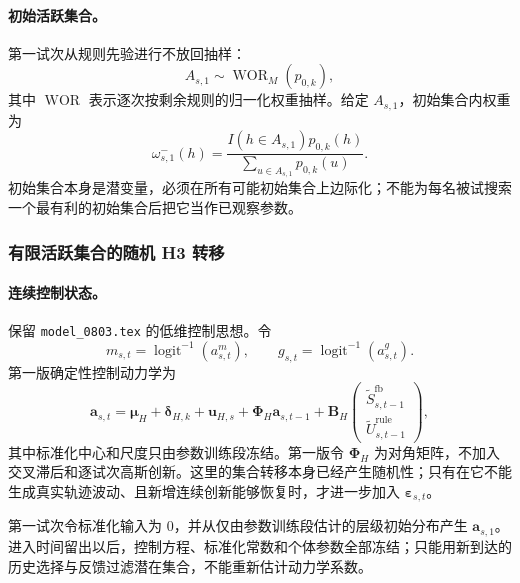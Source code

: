 \paragraph{初始活跃集合。}
第一试次从规则先验进行不放回抽样：
\begin{equation}
    A_{s,1}\sim
    \operatorname{WOR}_M(p_{0,k}),
    \label{eq:model0804-initial-set}
\end{equation}
其中 $\operatorname{WOR}$ 表示逐次按剩余规则的归一化权重抽样。给定 $A_{s,1}$，初始集合内权重为
\begin{equation}
    \omega^-_{s,1}(h)
    =\frac{I(h\in A_{s,1})p_{0,k}(h)}
    {\sum_{u\in A_{s,1}}p_{0,k}(u)}.
    \label{eq:model0804-initial-weight}
\end{equation}
初始集合本身是潜变量，必须在所有可能初始集合上边际化；不能为每名被试搜索一个最有利的初始集合后把它当作已观察参数。


\subsubsection{有限活跃集合的随机 H3 转移}

\paragraph{连续控制状态。}
保留 \texttt{model\_0803.tex} 的低维控制思想。令
\begin{equation}
    m_{s,t}=\operatorname{logit}^{-1}(a^m_{s,t}),
    \qquad
    g_{s,t}=\operatorname{logit}^{-1}(a^g_{s,t}).
    \label{eq:model0804-controls}
\end{equation}
第一版确定性控制动力学为
\begin{equation}
    \mathbf a_{s,t}
    =\boldsymbol\mu_H+\boldsymbol\delta_{H,k}
     +\mathbf u_{H,s}
     +\boldsymbol\Phi_H\mathbf a_{s,t-1}
     +\mathbf B_H
       \begin{pmatrix}
       \widetilde S^{\mathrm{fb}}_{s,t-1}\\
       \widetilde U^{\mathrm{rule}}_{s,t-1}
       \end{pmatrix},
    \label{eq:model0804-control-dynamics}
\end{equation}
其中标准化中心和尺度只由参数训练段冻结。第一版令 $\boldsymbol\Phi_H$ 为对角矩阵，不加入交叉滞后和逐试次高斯创新。这里的集合转移本身已经产生随机性；只有在它不能生成真实轨迹波动、且新增连续创新能够恢复时，才进一步加入 $\boldsymbol\varepsilon_{s,t}$。

第一试次令标准化输入为 0，并从仅由参数训练段估计的层级初始分布产生 $\mathbf a_{s,1}$。进入时间留出以后，控制方程、标准化常数和个体参数全部冻结；只能用新到达的历史选择与反馈过滤潜在集合，不能重新估计动力学系数。

